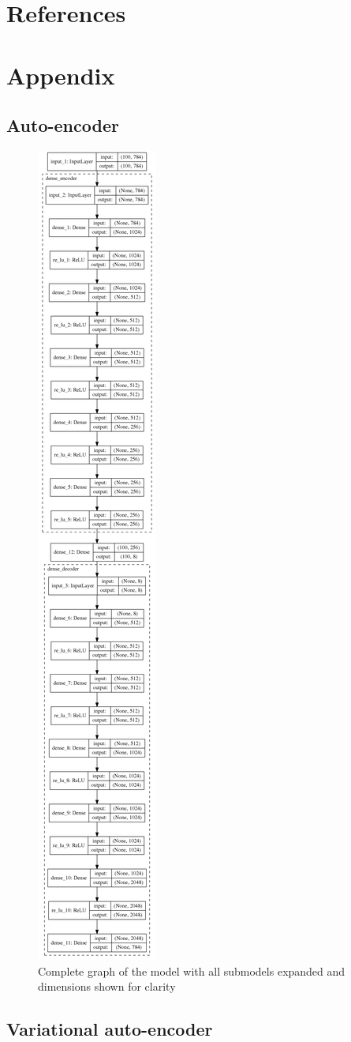 \documentclass[12pt, english]{article}
\begin{document}
\section*{References}
\label{sec:references}
\printbibliography[heading=none]

\appendix
\section*{Appendix}
\label{sec:appendix}

\subsection*{Auto-encoder}
\label{sec:auto-encoder}

\begin{figure}[H]
    \centering
    \includegraphics[width=0.12\linewidth]{DenseAutoEncoder_vertical.png} 
    \caption{Complete graph of the model with all submodels expanded and dimensions shown for clarity} 
    \label{fig:dense-auto-encoder}
\end{figure}

\subsection*{Variational auto-encoder}
\label{sec:vae}
\end{document}

